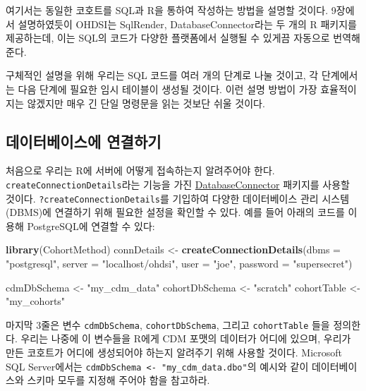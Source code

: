 \documentclass[11pt]{book}
\newenvironment{Shaded}{\begin{snugshade}}{\end{snugshade}}
\newcommand{\KeywordTok}[1]{\textcolor[rgb]{0.13,0.29,0.53}{\textbf{#1}}}
\newcommand{\DataTypeTok}[1]{\textcolor[rgb]{0.13,0.29,0.53}{#1}}
\newcommand{\StringTok}[1]{\textcolor[rgb]{0.31,0.60,0.02}{#1}}
\newcommand{\NormalTok}[1]{#1}
\theoremstyle{definition}
\theoremstyle{definition}
\theoremstyle{definition}
\theoremstyle{remark}
\begin{document}
여기서는 동일한 코호트를 SQL과 R을 통하여 작성하는 방법을 설명할 것이다.
9장에서 설명하였듯이 OHDSI는 SqlRender, DatabaseConnector라는 두 개의 R
패키지를 제공하는데, 이는 SQL의 코드가 다양한 플랫폼에서 실행될 수
있게끔 자동으로 번역해준다.

구체적인 설명을 위해 우리는 SQL 코드를 여러 개의 단계로 나눌 것이고, 각
단계에서는 다음 단계에 필요한 임시 테이블이 생성될 것이다. 이런 설명
방법이 가장 효율적이지는 않겠지만 매우 긴 단일 명령문을 읽는 것보단 쉬울
것이다.

\subsection{데이터베이스에 연결하기}\label{-}

처음으로 우리는 R에 서버에 어떻게 접속하는지 알려주어야 한다.
\texttt{createConnectionDetails}라는 기능을 가진
\href{https://ohdsi.github.io/DatabaseConnector/}{DatabaseConnector}
패키지를 사용할 것이다. \texttt{?createConnectionDetails}를 기입하여
다양한 데이터베이스 관리 시스템(DBMS)에 연결하기 위해 필요한 설정을
확인할 수 있다. 예를 들어 아래의 코드를 이용해 PostgreSQL에 연결할 수
있다:

\begin{Shaded}
\begin{Highlighting}[]
\KeywordTok{library}\NormalTok{(CohortMethod)}
\NormalTok{connDetails <-}\StringTok{ }\KeywordTok{createConnectionDetails}\NormalTok{(}\DataTypeTok{dbms =} \StringTok{"postgresql"}\NormalTok{,}
                                       \DataTypeTok{server =} \StringTok{"localhost/ohdsi"}\NormalTok{,}
                                       \DataTypeTok{user =} \StringTok{"joe"}\NormalTok{,}
                                       \DataTypeTok{password =} \StringTok{"supersecret"}\NormalTok{)}

\NormalTok{cdmDbSchema <-}\StringTok{ "my_cdm_data"}
\NormalTok{cohortDbSchema <-}\StringTok{ "scratch"}
\NormalTok{cohortTable <-}\StringTok{ "my_cohorts"}
\end{Highlighting}
\end{Shaded}

마지막 3줄은 변수 \texttt{cdmDbSchema}, \texttt{cohortDbSchema}, 그리고
\texttt{cohortTable} 들을 정의한다. 우리는 나중에 이 변수들을 R에게 CDM
포맷의 데이터가 어디에 있으며, 우리가 만든 코호트가 어디에 생성되어야
하는지 알려주기 위해 사용할 것이다. Microsoft SQL Server에서는
\texttt{cdmDbSchema\ \textless{}-\ "my\_cdm\_data.dbo"}의 예시와 같이
데이터베이스와 스키마 모두를 지정해 주어야 함을 참고하라.
\end{document}
